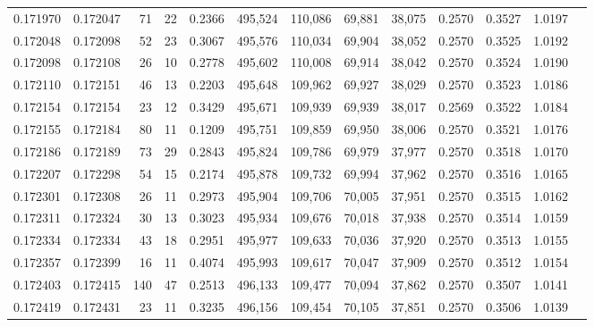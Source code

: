 \begin{tabular}{rrrrrrrrrrrrr}
0.171970 & 0.172047 &    71 &  22 &                                     0.2366 & 495,524 & 110,086 &  69,881 &  38,075 & 0.2570 & 0.3527 & 1.0197 \\
0.172048 & 0.172098 &    52 &  23 &                                     0.3067 & 495,576 & 110,034 &  69,904 &  38,052 & 0.2570 & 0.3525 & 1.0192 \\
0.172098 & 0.172108 &    26 &  10 &                                     0.2778 & 495,602 & 110,008 &  69,914 &  38,042 & 0.2570 & 0.3524 & 1.0190 \\
0.172110 & 0.172151 &    46 &  13 &                                     0.2203 & 495,648 & 109,962 &  69,927 &  38,029 & 0.2570 & 0.3523 & 1.0186 \\
0.172154 & 0.172154 &    23 &  12 &                                     0.3429 & 495,671 & 109,939 &  69,939 &  38,017 & 0.2569 & 0.3522 & 1.0184 \\
0.172155 & 0.172184 &    80 &  11 &                                     0.1209 & 495,751 & 109,859 &  69,950 &  38,006 & 0.2570 & 0.3521 & 1.0176 \\
0.172186 & 0.172189 &    73 &  29 &                                     0.2843 & 495,824 & 109,786 &  69,979 &  37,977 & 0.2570 & 0.3518 & 1.0170 \\
0.172207 & 0.172298 &    54 &  15 &                                     0.2174 & 495,878 & 109,732 &  69,994 &  37,962 & 0.2570 & 0.3516 & 1.0165 \\
0.172301 & 0.172308 &    26 &  11 &                                     0.2973 & 495,904 & 109,706 &  70,005 &  37,951 & 0.2570 & 0.3515 & 1.0162 \\
0.172311 & 0.172324 &    30 &  13 &                                     0.3023 & 495,934 & 109,676 &  70,018 &  37,938 & 0.2570 & 0.3514 & 1.0159 \\
0.172334 & 0.172334 &    43 &  18 &                                     0.2951 & 495,977 & 109,633 &  70,036 &  37,920 & 0.2570 & 0.3513 & 1.0155 \\
0.172357 & 0.172399 &    16 &  11 &                                     0.4074 & 495,993 & 109,617 &  70,047 &  37,909 & 0.2570 & 0.3512 & 1.0154 \\
0.172403 & 0.172415 &   140 &  47 &                                     0.2513 & 496,133 & 109,477 &  70,094 &  37,862 & 0.2570 & 0.3507 & 1.0141 \\
0.172419 & 0.172431 &    23 &  11 &                                     0.3235 & 496,156 & 109,454 &  70,105 &  37,851 & 0.2570 & 0.3506 & 1.0139 \\

\end{tabular}

